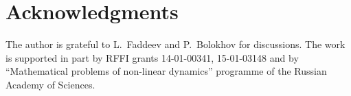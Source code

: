 \documentclass[12pt]{article}
\begin{document}



\section*{Acknowledgments}
    The author is grateful to L.~Faddeev and P.~Bolokhov for discussions.
	The work is supported in part by RFFI grants 14-01-00341, 15-01-03148
	and by ``Mathematical problems of non-linear dynamics'' programme
	of the Russian Academy of Sciences.
\end{document}
